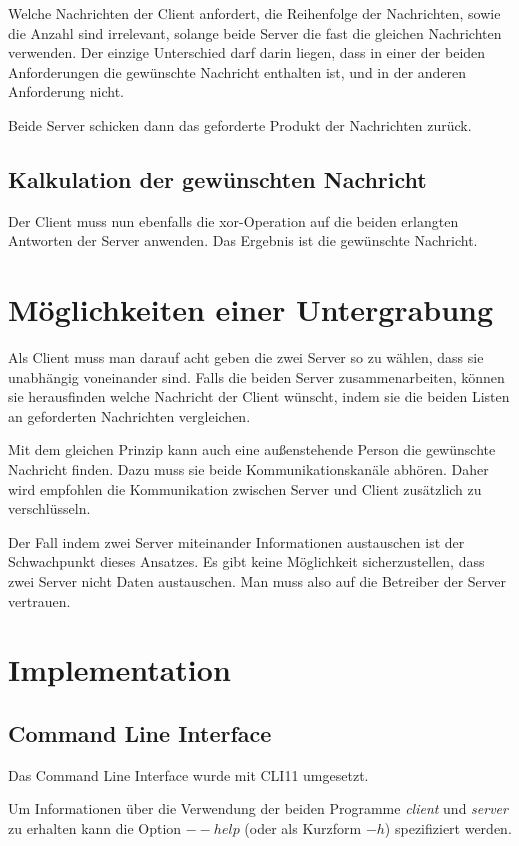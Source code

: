 \documentclass[]{article}
\begin{document}
Welche Nachrichten der Client anfordert, die Reihenfolge der Nachrichten, sowie die Anzahl sind irrelevant, solange beide Server die fast die gleichen Nachrichten verwenden. Der einzige Unterschied darf darin liegen, dass in einer der beiden Anforderungen die gewünschte Nachricht enthalten ist, und in der anderen Anforderung nicht.

Beide Server schicken dann das geforderte Produkt der Nachrichten zurück.

\subsection{Kalkulation der gewünschten Nachricht}
Der Client muss nun ebenfalls die xor-Operation auf die beiden erlangten Antworten der Server anwenden. Das Ergebnis ist die gewünschte Nachricht.

\section{Möglichkeiten einer Untergrabung}
Als Client muss man darauf acht geben die zwei Server so zu wählen, dass sie unabhängig voneinander sind. Falls die beiden Server zusammenarbeiten, können sie herausfinden welche Nachricht der Client wünscht, indem sie die beiden Listen an geforderten Nachrichten vergleichen.

Mit dem gleichen Prinzip kann auch eine außenstehende Person die gewünschte Nachricht finden. Dazu muss sie beide Kommunikationskanäle abhören. Daher wird empfohlen die Kommunikation zwischen Server und Client zusätzlich zu verschlüsseln.

Der Fall indem zwei Server miteinander Informationen austauschen ist der Schwachpunkt dieses Ansatzes. Es gibt keine Möglichkeit sicherzustellen, dass zwei Server nicht Daten austauschen. Man muss also auf die Betreiber der Server vertrauen.

\section{Implementation}
\subsection{Command Line Interface}
Das Command Line Interface wurde mit CLI11 umgesetzt.

Um Informationen über die Verwendung der beiden Programme \textit{client} und \textit{server} zu erhalten kann die Option $--help$ (oder als Kurzform $-h$) spezifiziert werden.
\end{document}
